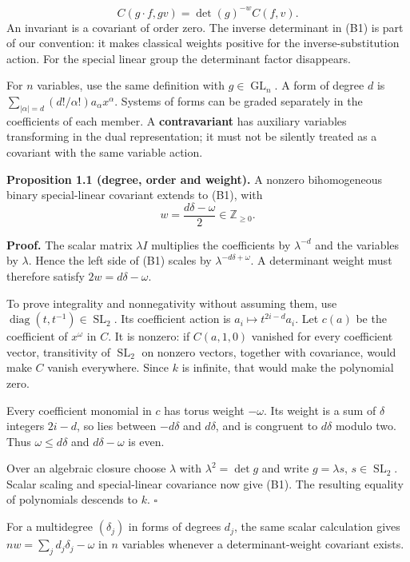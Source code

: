 \documentclass[
]{article}
\begin{document}
\[
C(g\cdot f,gv)=\det(g)^{-w}C(f,v).
\tag{B1}
\] An invariant is a covariant of order zero. The inverse determinant in
(B1) is part of our convention: it makes classical weights positive for
the inverse-substitution action. For the special linear group the
determinant factor disappears.

For \(n\) variables, use the same definition with
\(g\in\operatorname{GL}_n\). A form of degree \(d\) is
\(\sum_{|\alpha|=d}(d!/\alpha!)a_\alpha x^\alpha\). Systems of forms can
be graded separately in the coefficients of each member. A
\textbf{contravariant} has auxiliary variables transforming in the dual
representation; it must not be silently treated as a covariant with the
same variable action.

\protect{}\label{proposition-1-1}{}

\textbf{Proposition 1.1 (degree, order and weight).} A nonzero
bihomogeneous binary special-linear covariant extends to (B1), with \[
w=\frac{d\delta-\omega}{2}\in\mathbb Z_{\geq0}.
\]

\textbf{Proof.} The scalar matrix \(\lambda I\) multiplies the
coefficients by \(\lambda^{-d}\) and the variables by \(\lambda\). Hence
the left side of (B1) scales by \(\lambda^{-d\delta+\omega}\). A
determinant weight must therefore satisfy \(2w=d\delta-\omega\).

To prove integrality and nonnegativity without assuming them, use
\(\operatorname{diag}(t,t^{-1})\in\operatorname{SL}_2\). Its coefficient
action is \(a_i\mapsto t^{2i-d}a_i\). Let \(c(a)\) be the coefficient of
\(x^\omega\) in \(C\). It is nonzero: if \(C(a,1,0)\) vanished for every
coefficient vector, transitivity of \(\operatorname{SL}_2\) on nonzero
vectors, together with covariance, would make \(C\) vanish everywhere.
Since \(k\) is infinite, that would make the polynomial zero.

Every coefficient monomial in \(c\) has torus weight \(-\omega\). Its
weight is a sum of \(\delta\) integers \(2i-d\), so lies between
\(-d\delta\) and \(d\delta\), and is congruent to \(d\delta\) modulo
two. Thus \(\omega\leq d\delta\) and \(d\delta-\omega\) is even.

Over an algebraic closure choose \(\lambda\) with \(\lambda^2=\det g\)
and write \(g=\lambda s\), \(s\in\operatorname{SL}_2\). Scalar scaling
and special-linear covariance now give (B1). The resulting equality of
polynomials descends to \(k\). \(\square\)

For a multidegree \((\delta_j)\) in forms of degrees \(d_j\), the same
scalar calculation gives \(nw=\sum_jd_j\delta_j-\omega\) in \(n\)
variables whenever a determinant-weight covariant exists.
\end{document}
